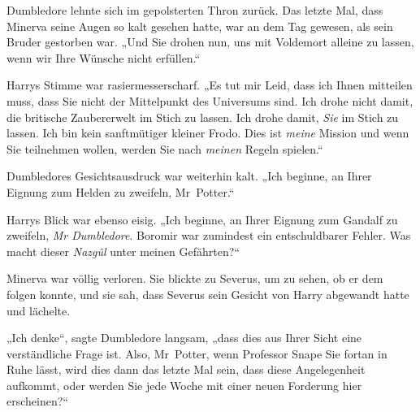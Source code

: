 Dumbledore lehnte sich im gepolsterten Thron zurück. Das letzte Mal, dass Minerva seine Augen so kalt gesehen hatte, war an dem Tag gewesen, als sein Bruder gestorben war. „Und Sie drohen nun, uns mit Voldemort alleine zu lassen, wenn wir Ihre Wünsche nicht erfüllen.“ 

Harrys Stimme war rasiermesserscharf. „Es tut mir Leid, dass ich Ihnen mitteilen muss, dass Sie nicht der Mittelpunkt des Universums sind. Ich drohe nicht damit, die britische Zaubererwelt im Stich zu lassen. Ich drohe damit, \emph{Sie} im Stich zu lassen. Ich bin kein sanftmütiger kleiner Frodo. Dies ist \emph{meine} Mission und wenn Sie teilnehmen wollen, werden Sie nach \emph{meinen} Regeln spielen.“ 

Dumbledores Gesichtsausdruck war weiterhin kalt. „Ich beginne, an Ihrer Eignung zum Helden zu zweifeln, Mr~Potter.“ 

Harrys Blick war ebenso eisig. „Ich beginne, an Ihrer Eignung zum Gandalf zu zweifeln, \emph{Mr Dumbledore}. Boromir war zumindest ein entschuldbarer Fehler. Was macht dieser \emph{Nazgûl} unter meinen Gefährten?“ 

Minerva war völlig verloren. Sie blickte zu Severus, um zu sehen, ob er dem folgen konnte, und sie sah, dass Severus sein Gesicht von Harry abgewandt hatte und lächelte. 

„Ich denke“, sagte Dumbledore langsam, „dass dies aus Ihrer Sicht eine verständliche Frage ist. Also, Mr~Potter, wenn Professor Snape Sie fortan in Ruhe lässt, wird dies dann das letzte Mal sein, dass diese Angelegenheit aufkommt, oder werden Sie jede Woche mit einer neuen Forderung hier erscheinen?“ 

